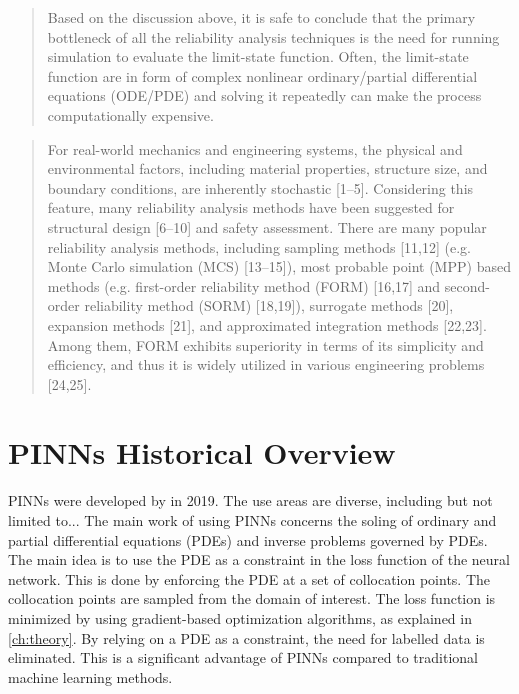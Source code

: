 \begin{quotation}
    Based on the discussion above, it is safe to conclude that the primary bottleneck of all the reliability analysis techniques is the need for running simulation to evaluate the limit-state function. Often, the limit-state function are in form of complex nonlinear ordinary/partial differential equations (ODE/PDE) and solving it repeatedly can make the process computationally expensive. \citep{chakraborty2020simulationfreereliabilityanalysis}
\end{quotation}

\begin{quotation}
For real-world mechanics and engineering systems, the physical and environmental factors, including material properties, structure size, and boundary conditions, are inherently stochastic [1–5]. Considering this feature, many reliability analysis methods have been suggested for structural design [6–10] and safety assessment. There are many popular reliability analysis methods, including sampling methods [11,12] (e.g. Monte Carlo simulation (MCS) [13–15]), most probable point (MPP) based methods (e.g. first-order reliability method (FORM) [16,17] and second-order reliability method (SORM) [18,19]), surrogate methods [20], expansion methods [21], and approximated integration methods [22,23]. Among them, FORM exhibits superiority in terms of its simplicity and efficiency, and thus it is widely utilized in various engineering problems [24,25]. \citep{PINN-FORM}
\end{quotation}

\section{PINNs Historical Overview}
\label{sec:historical-overview}

PINNs were developed by \cite{raissi2019pinns} in 2019. The use areas are diverse, including but not limited to...
The main work of using PINNs concerns the soling of ordinary and partial differential equations (PDEs) and inverse problems governed by PDEs. The main idea is to use the PDE as a constraint in the loss function of the neural network. This is done by enforcing the PDE at a set of collocation points. The collocation points are sampled from the domain of interest. The loss function is minimized by using gradient-based optimization algorithms, as explained in \ref{ch:theory}. By relying on a PDE as a constraint, the need for labelled data is eliminated. This is a significant advantage of PINNs compared to traditional machine learning methods. 

